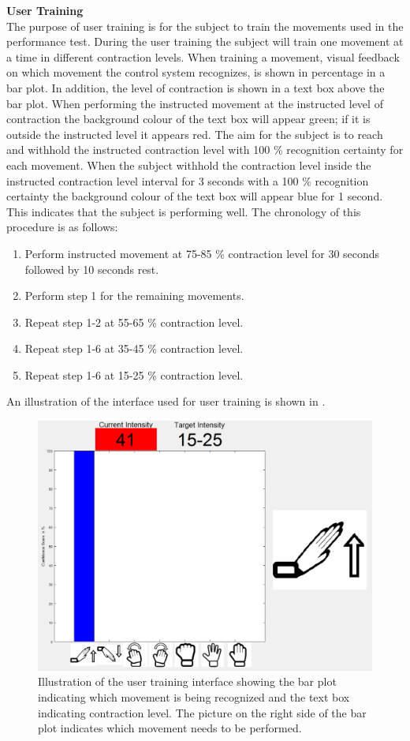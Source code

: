 \textbf{User Training} \\ %
The purpose of user training is for the subject to train the movements used in the performance test. During the user training the subject will train one movement at a time in different contraction levels. When training a movement, visual feedback on which movement the control system recognizes, is shown in percentage in a bar plot. In addition, the level of contraction is shown in a text box above the bar plot. When performing the instructed movement at the instructed level of contraction the background colour of the text box will appear green; if it is outside the instructed level it appears red. The aim for the subject is to reach and withhold the instructed contraction level with 100 \% recognition certainty for each movement. When the subject withhold the contraction level inside the instructed contraction level interval for 3 seconds with a 100 \% recognition certainty the background colour of the text box will appear blue for 1 second. This indicates that the subject is performing well. The chronology of this procedure is as follows:

\begin{enumerate}
	\item Perform instructed movement at 75-85 \% contraction level for 30 seconds followed by 10 seconds rest.
	\item Perform step 1 for the remaining movements.
	\item Repeat step 1-2 at 55-65 \% contraction level.
	\item Repeat step 1-6 at 35-45 \% contraction level.
	\item Repeat step 1-6 at 15-25 \% contraction level.
\end{enumerate} 

An illustration of the interface used for user training is shown in .

\begin{figure}[H]                 
	\includegraphics[width=.6\textwidth]{figures/xBackground/usertraincontrolGUI}  
	\caption{Illustration of the user training interface showing the bar plot indicating which movement is being recognized and the text box indicating contraction level. The picture on the right side of the bar plot indicates which movement needs to be performed.}
	\label{fig:usertraincontrolGUI} 
\end{figure}

